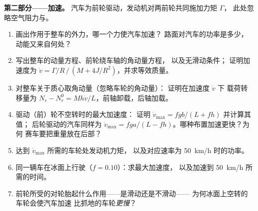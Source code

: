 \begin{problem}
\medskip
\noindent\textbf{第二部分——加速。}
汽车为前轮驱动，发动机对两前轮共同施加力矩 $\Gamma$，
此处忽略空气阻力与。
\begin{enumerate}[resume]
  \item 画出作用于整车的外力，哪一个力使汽车加速？
        路面对汽车的功率是多少，
        动能又来自何处？
  \item 写出整车的动量方程、前轮绕车轴的角动量方程，
        以及无滑动条件；
        证明加速度为 $\dot v =
        \Gamma/R\,/\,(M + 4J/R^2)$，并求等效质量。
  \item 对整车关于质心取角动量（忽略车轮的角动量）：
        证明在加速度 $\dot v$ 下
        载荷转移量为 $N_r - N_r^0 =
        Mh\dot v/L$，前轴卸载，后轴加载。
  \item 驱动（前）轮不空转时的最大加速度：
        证明 $\dot v_{\max} = fgb/(L + fh)$ 并计算其值；
        后轮驱动的汽车同样为 $\dot v_{\max} =
        fga/(L - fh)$。哪种布置加速更快？为何
        赛车要把重量放在后部？
  \item 达到 $\dot v_{\max}$ 所需的车轮处发动机力矩，
        以及对应速率为 \qty{50}{km/h} 时的功率。
  \item 同一辆车在冰面上行驶（$f = 0.10$）：求最大加速度，
        以及加速到 \qty{50}{km/h} 所需的时间。
  \item 前轮所受的对轮胎起什么作用——是滑动还是不滑动——
        为何冰面上空转的车轮会使汽车加速
        比抓地的车轮\emph{更慢}？
\end{enumerate}


\end{problem}
